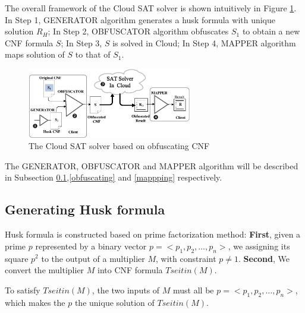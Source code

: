\documentclass[runningheads,a4paper]{llncs}
\begin{document}
The overall framework of the Cloud SAT solver is shown intuitively in Figure \ref{fig_cldSAT}.
In Step 1,
GENERATOR algorithm generates a husk formula with unique solution $R_H$;
In Step 2,
OBFUSCATOR algorithm obfuscates $S_1$ to obtain a new CNF formula $S$;
In Step 3,
$S$ is solved in Cloud;
In Step 4,
MAPPER algorithm maps solution of $S$ to that of $S_1$.


\begin{figure}
\centering
\includegraphics[width=7.2cm]{a5}
\caption{The Cloud SAT solver based on obfuscating CNF}
\label{fig_cldSAT}
\end{figure}




The GENERATOR, OBFUSCATOR and MAPPER algorithm will be described in Subsection \ref{genhusk},\ref{obfuscating} 
and \ref{mappping} respectively.

\subsection{Generating Husk formula}\label{genhusk}
Husk formula is constructed based on prime factorization method:
\textbf{First},
given a prime $p$ represented by a binary vector $p = <p_1,p_2,\dots,p_n>$, 
we assigning its square $p^2$ to the output of a multiplier $M$, 
with constraint $p\ne 1$.
\textbf{Second},
We convert the multiplier $M$ into CNF formula $Tseitin(M)$.

To satisfy $Tseitin(M)$,
the two inputs of $M$ must all be $p = <p_1,p_2,\dots,p_n>$,
which makes the $p$ the unique solution of $Tseitin(M)$.
\end{document}
